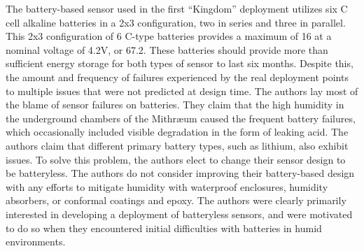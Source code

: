 The battery-based sensor used in the first ``Kingdom'' deployment utilizes six C cell alkaline batteries in a 2x3 configuration, two in series and three in parallel.
This 2x3 configuration of 6 C-type batteries provides a maximum of 16\ssi{\Ah} at a nominal voltage of 4.2V, or 67.2\ssi{\Wh}.
These batteries should provide more than sufficient energy storage for both types of sensor to last six months.
Despite this, the amount and
frequency of failures experienced by the real deployment points to multiple
issues that were not predicted at design time.
The authors lay most of the blame of
sensor failures on batteries.
They claim that the high humidity in the
underground chambers of the Mithræum caused the frequent battery failures, which occasionally included visible degradation in the form of leaking acid. 
The authors claim that different primary battery types, such as
lithium, also exhibit issues.
To solve this problem, the authors elect to change their sensor design to be batteryless.
The authors do not consider improving their battery-based design with any efforts to mitigate
humidity with waterproof enclosures, humidity absorbers, or conformal coatings and epoxy.
The authors were clearly primarily interested in developing a  
deployment of batteryless sensors, and were motivated to do so when they encountered initial difficulties with
batteries in humid environments.

